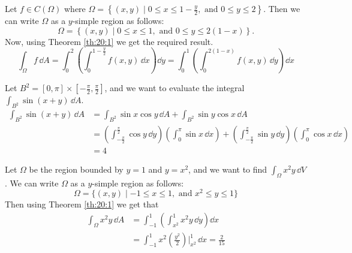 \documentclass[../Analysis-3.tex]{subfiles}
\begin{document}
\begin{Eg}{}{}
  Let $f \in C(\Omega)$ where $\Omega = \left\{ (x,y) \mid 0 \leq x \leq 1 - \frac{y}{2}, \mbox{ and } 0 \leq y \leq 2 \right\}$. Then we can write $\Omega$ as a $y$-simple region as follows:
  \[
    \Omega = \left\{ (x,y) \mid 0 \leq x \leq 1, \mbox{ and } 0 \leq y \leq 2(1-x) \right\}.
  \]
  Now, using Theorem \ref{th:20:1} we get the required result.
  \[
    \int_{\Omega} f \, \dd A = \int_0^2 \left( \int_0^{1-\frac{y}{2}} f(x,y) \, \dd x\right) \dd y  =  \int_0^1 \left( \int_0^{2(1-x)} f(x,y) \, \dd y\right) \dd x
  \]
\end{Eg}

\begin{Eg}{}{}
  Let $B^2 = [0,\pi] \times [-\frac{\pi}{2}, \frac{\pi}{2}]$, and we want to evaluate the integral $\displaystyle\int_{B^2} \sin (x+y) \, \dd A$.
  \begin{align*}
    \int_{B^2}\sin(x+y) \, \dd A
     & = \int_{B^2} \sin x \cos y \, \dd A + \int_{B^2} \sin y \cos x \, \dd A                                                                                                                                                             \\
     & = \left( \int_{-\frac{\pi}{2}}^{\frac{\pi}{2}} \cos y \, \dd y\right)\left( \int_{0}^{\pi} \sin x \, \dd x\right) + \left( \int_{-\frac{\pi}{2}}^{\frac{\pi}{2}} \sin y \, \dd y\right)\left( \int_{0}^{\pi} \cos x \, \dd x\right) \\
     & = 4
  \end{align*}
\end{Eg}

\begin{Eg}{}{}
  Let $\Omega$ be the region bounded by $y = 1$ and $y = x^2$, and we want to find $\displaystyle\int_{\Omega} x^2y \, \dd V$. We can write $\Omega$ as a $y$-simple region as follows:
  \[
    \Omega = \{ (x,y) \mid -1 \leq x \leq 1, \mbox{ and } x^2 \leq y \leq 1 \}
  \]
  Then using Theorem \ref{th:20:1} we get that
  \begin{align*}
    \int_{\Omega} x^2y \, \dd A
     & = \int_{-1}^1 \left( \int_{x^2}^1 x^2y \, \dd y\right)\dd x                              \\
     & = \int_{-1}^1 x^2 \left( \frac{y^2}{2} \right)\bigg\vert_{x^2}^1 \, \dd x = \frac{2}{15}
  \end{align*}
\end{Eg}
\end{document}
